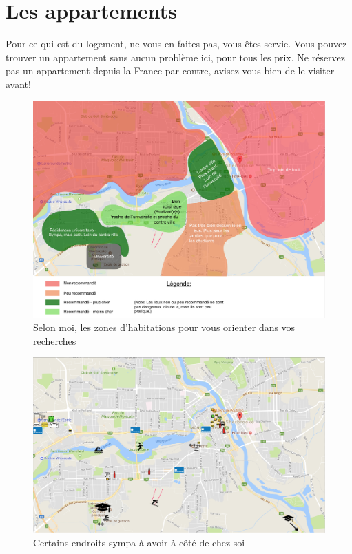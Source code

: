 \section{Les appartements}\label{sec:sec4.3}
Pour ce qui est du logement, ne vous en faites pas, vous êtes servie. Vous pouvez trouver un appartement sans aucun problème ici, pour tous les prix. Ne réservez pas un appartement depuis la France par contre, avisez-vous bien de le visiter avant!

\begin{figure}[h!]
\centering
\includegraphics[width = 150mm]{figures/Places_To_Live}
\caption{Selon moi, les zones d'habitations pour vous orienter dans vos recherches}
\end{figure}

\clearpage

\begin{figure}[h!]
\centering
\includegraphics[width = 150mm]{figures/Good_Places}
\caption{Certains endroits sympa à avoir à côté de chez soi}
\end{figure}

